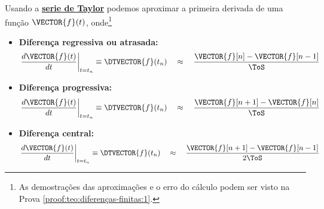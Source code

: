 \begin{theorem}
\label{teo:diferenças-finitas:1}
Usando a \hyperref[def:taylor]{\textbf{serie de Taylor}} podemos aproximar 
a primeira derivada de uma função $\VECTOR{f}(t)$, onde\footnote{As
demostrações das aproximações e o erro do cálculo podem ser visto na Prova \ref{proof:teo:diferenças-finitas:1}.}
\begin{itemize}
\item \textbf{Diferença regressiva ou atrasada:}
\begin{equation}
\left.\frac{d\VECTOR{f}(t)}{dt}\right|_{t=t_n}\equiv \DTVECTOR{f}(t_n)
\quad \approx \quad
\frac{\VECTOR{f}[n]-\VECTOR{f}[n-1]}{\ToS}
\end{equation}
\item \textbf{Diferença progressiva:}
\begin{equation}
\left.\frac{d\VECTOR{f}(t)}{dt}\right|_{t=t_n}\equiv \DTVECTOR{f}(t_n)
\quad \approx \quad
\frac{\VECTOR{f}[n+1]-\VECTOR{f}[n]}{\ToS}
\end{equation}
\item \textbf{Diferença central:}
\begin{equation}
\left.\frac{d\VECTOR{f}(t)}{dt}\right|_{t=t_n}\equiv \DTVECTOR{f}(t_n)
\quad \approx \quad
\frac{\VECTOR{f}[n+1]-\VECTOR{f}[n-1]}{2\ToS}
\end{equation}
\end{itemize}
\end{theorem}



